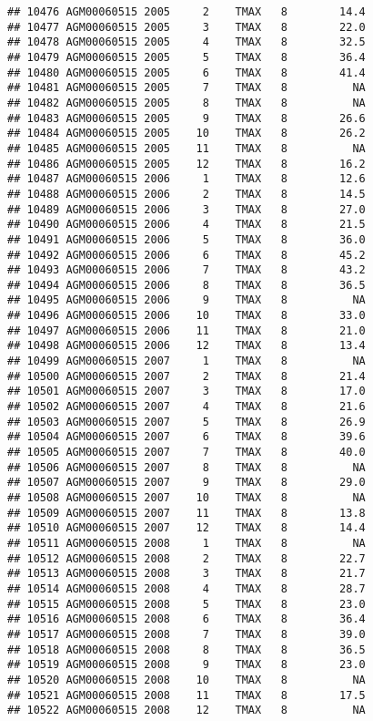 \documentclass{article}\usepackage[]{graphicx}\usepackage[]{color}
\makeatletter
\newenvironment{kframe}{%
 \def\at@end@of@kframe{}%
 \ifinner\ifhmode%
  \def\at@end@of@kframe{\end{minipage}}%
  \begin{minipage}{\columnwidth}%
 \fi\fi%
 \def\FrameCommand##1{\hskip\@totalleftmargin \hskip-\fboxsep
 \colorbox{shadecolor}{##1}\hskip-\fboxsep
     \hskip-\linewidth \hskip-\@totalleftmargin \hskip\columnwidth}%
 \MakeFramed {\advance\hsize-\width
   \@totalleftmargin\z@ \linewidth\hsize
   \@setminipage}}%
 {\par\unskip\endMakeFramed%
 \at@end@of@kframe}
\newenvironment{knitrout}{}{} %
\makeatother
\begin{document}
\begin{knitrout}
\begin{kframe}
\begin{verbatim}
## 10476 AGM00060515 2005     2    TMAX   8        14.4
## 10477 AGM00060515 2005     3    TMAX   8        22.0
## 10478 AGM00060515 2005     4    TMAX   8        32.5
## 10479 AGM00060515 2005     5    TMAX   8        36.4
## 10480 AGM00060515 2005     6    TMAX   8        41.4
## 10481 AGM00060515 2005     7    TMAX   8          NA
## 10482 AGM00060515 2005     8    TMAX   8          NA
## 10483 AGM00060515 2005     9    TMAX   8        26.6
## 10484 AGM00060515 2005    10    TMAX   8        26.2
## 10485 AGM00060515 2005    11    TMAX   8          NA
## 10486 AGM00060515 2005    12    TMAX   8        16.2
## 10487 AGM00060515 2006     1    TMAX   8        12.6
## 10488 AGM00060515 2006     2    TMAX   8        14.5
## 10489 AGM00060515 2006     3    TMAX   8        27.0
## 10490 AGM00060515 2006     4    TMAX   8        21.5
## 10491 AGM00060515 2006     5    TMAX   8        36.0
## 10492 AGM00060515 2006     6    TMAX   8        45.2
## 10493 AGM00060515 2006     7    TMAX   8        43.2
## 10494 AGM00060515 2006     8    TMAX   8        36.5
## 10495 AGM00060515 2006     9    TMAX   8          NA
## 10496 AGM00060515 2006    10    TMAX   8        33.0
## 10497 AGM00060515 2006    11    TMAX   8        21.0
## 10498 AGM00060515 2006    12    TMAX   8        13.4
## 10499 AGM00060515 2007     1    TMAX   8          NA
## 10500 AGM00060515 2007     2    TMAX   8        21.4
## 10501 AGM00060515 2007     3    TMAX   8        17.0
## 10502 AGM00060515 2007     4    TMAX   8        21.6
## 10503 AGM00060515 2007     5    TMAX   8        26.9
## 10504 AGM00060515 2007     6    TMAX   8        39.6
## 10505 AGM00060515 2007     7    TMAX   8        40.0
## 10506 AGM00060515 2007     8    TMAX   8          NA
## 10507 AGM00060515 2007     9    TMAX   8        29.0
## 10508 AGM00060515 2007    10    TMAX   8          NA
## 10509 AGM00060515 2007    11    TMAX   8        13.8
## 10510 AGM00060515 2007    12    TMAX   8        14.4
## 10511 AGM00060515 2008     1    TMAX   8          NA
## 10512 AGM00060515 2008     2    TMAX   8        22.7
## 10513 AGM00060515 2008     3    TMAX   8        21.7
## 10514 AGM00060515 2008     4    TMAX   8        28.7
## 10515 AGM00060515 2008     5    TMAX   8        23.0
## 10516 AGM00060515 2008     6    TMAX   8        36.4
## 10517 AGM00060515 2008     7    TMAX   8        39.0
## 10518 AGM00060515 2008     8    TMAX   8        36.5
## 10519 AGM00060515 2008     9    TMAX   8        23.0
## 10520 AGM00060515 2008    10    TMAX   8          NA
## 10521 AGM00060515 2008    11    TMAX   8        17.5
## 10522 AGM00060515 2008    12    TMAX   8          NA

\end{verbatim}
\end{kframe}
\end{knitrout}
\end{document}

